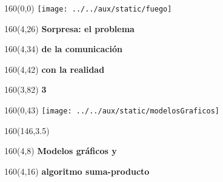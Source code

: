 \documentclass[shownotes,aspectratio=169]{beamer}
\begin{document}
\begin{frame}

\begin{textblock}{160}(0,0)
\texttt{[image: ../../aux/static/fuego]}
\end{textblock}

\begin{textblock}{160}(4,26)
\LARGE \textcolor{black!5}{\fontsize{22}{0}\selectfont \textbf{Sorpresa: el problema}}
\end{textblock}
\begin{textblock}{160}(4,34)
\LARGE \textcolor{black!5}{\fontsize{22}{0}\selectfont \textbf{de la comunicación}}
\end{textblock}
\begin{textblock}{160}(4,42)
\LARGE \textcolor{black!5}{\fontsize{22}{0}\selectfont \textbf{con la realidad}}
\end{textblock}
\begin{textblock}{160}(3,82)
\LARGE \textcolor{black!15}{\fontsize{22}{0}\selectfont \textbf{3}}
\end{textblock}

\end{frame}

\begin{frame}
\begin{textblock}{160}(0,43)
\texttt{[image: ../../aux/static/modelosGraficos]}
\end{textblock}

\begin{textblock}{160}(146,3.5)
\LARGE \textcolor{black!85}{\scalebox{1.3}{$4$}}
\end{textblock}




\begin{textblock}{160}(4,8)
\LARGE \textcolor{black!90}{\fontsize{22}{0}\selectfont \textbf{Modelos gráficos y}}
\end{textblock}
\begin{textblock}{160}(4,16)
\LARGE \textcolor{black!90}{\fontsize{22}{0}\selectfont \textbf{algoritmo suma-producto}}
\end{textblock}

\end{frame}
\end{document}
